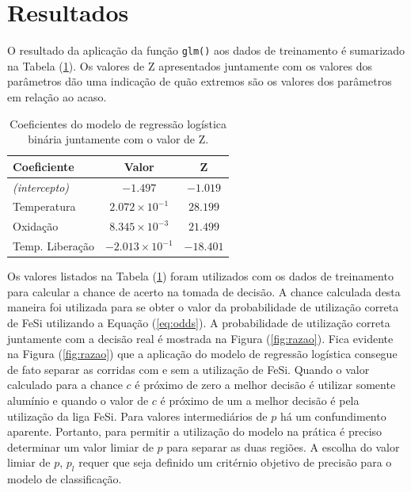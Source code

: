 \section{Resultados}
	O resultado da aplicação da função \texttt{glm()} aos dados de treinamento é sumarizado na Tabela (\ref{tab:result}). Os valores de Z apresentados juntamente com os valores dos parâmetros dão uma indicação de quão extremos são os valores dos parâmetros em relação ao acaso.
	\begin{table}[H]
		\centering
		\caption{Coeficientes do modelo de regressão logística binária juntamente com o valor de Z.}
		\label{tab:result}
		\begin{tabular}{lcc}
			\hline
			Coeficiente 			& Valor 					& Z  	\\
			\hline \hline
			\textit{(intercepto)}	& $-1.497$					& $-1.019$	\\			
			Temperatura 			& $ 2.072 \times 10^{-1}$	& $28.199$	\\
			Oxidação    			& $ 8.345 \times 10^{-3}$	& $21.499$	\\
			Temp. Liberação			& $-2.013 \times 10^{-1}$	& $-18.401$	\\			
			\hline \hline
		\end{tabular}
	\end{table}	
	Os valores listados na Tabela (\ref{tab:result}) foram utilizados com os dados de treinamento para calcular a chance de acerto na tomada de decisão. A chance calculada desta maneira foi utilizada para se obter o valor da probabilidade de utilização correta de FeSi utilizando a Equação (\ref{eq:odds}). A probabilidade de utilização correta juntamente com a decisão real é mostrada na Figura (\ref{fig:razao}).
	Fica evidente na Figura (\ref{fig:razao}) que a aplicação do modelo de regressão logística consegue de fato separar as corridas com e sem a utilização de FeSi. Quando o valor calculado para a chance $c$ é próximo de zero a melhor decisão é utilizar somente alumínio e quando o valor de $c$ é próximo de um a melhor decisão é pela utilização da liga FeSi. Para valores intermediários de $p$ há um confundimento aparente. Portanto, para permitir a utilização do modelo na prática é preciso determinar um valor limiar de $p$ para separar as duas regiões. A escolha do valor limiar de $p$, $p_l$ requer que seja definido um critérnio objetivo de precisão para o modelo de classificação.
